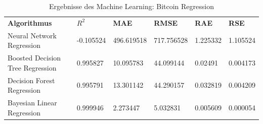 \begin{table}[H]
\centering
\begin{tabular}{|p{4cm}|p{}|p{}|p{}|p{}|p{}|}
\hline
\textbf{Algorithmus} & \textbf{$ R^2 $} & \textbf{MAE} & \textbf{RMSE} & \textbf{RAE} & \textbf{RSE}\\ 
\hhline{======}
Neural Network Regression & -0.105524 & 496.619518 & 717.756528 & 1.225332 & 1.105524 \\ \hline
Boosted Decision Tree Regression & 0.995827 & 10.095783 & 44.099144 & 0.02491 & 0.004173 \\ \hline
Decision Forest Regression & 0.995791 & 13.301142 & 44.290157 & 0.032819 & 0.004209 \\ \hline
Bayesian Linear Regression & 0.999946 & 2.273447 & 5.032831 & 0.005609 & 0.000054 \\ \hline
\end{tabular}
\caption{Ergebnisse des Machine Learning: Bitcoin Regression}
\label{tab:BTCReg}
\end{table}

